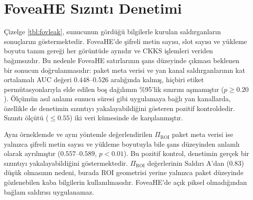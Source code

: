 \section{FoveaHE Sızıntı Denetimi}\label{sec:res:fovleak}

Çizelge \ref{tbl:fovleak}, sunucunun gördüğü bilgilerle kurulan saldırganların sonuçlarını göstermektedir. FoveaHE'de şifreli metin sayısı, slot sayısı ve yükleme boyutu tanım gereği her görüntüde aynıdır ve CKKS işlemleri veriden bağımsızdır. Bu nedenle FoveaHE satırlarının şans düzeyinde çıkması beklenen bir sonucun doğrulanmasıdır: paket meta verisi ve yan kanal saldırganlarının kat ortalamalı AUC değeri $0.448$--$0.526$ aralığında kalmış, hiçbiri etiket permütasyonlarıyla elde edilen boş dağılımın \%95'lik sınırını aşmamıştır ($p \geq 0.20$). Ölçümün asıl anlamı sunucu süresi gibi uygulamaya bağlı yan kanallarda, özellikle de denetimin sızıntıyı yakalayabildiğini gösteren pozitif kontroldedir. Sızıntı ölçütü ($\leq 0.55$) iki veri kümesinde de karşılanmıştır.

Aynı örneklemde ve aynı yöntemle değerlendirilen $\Pi_{\mathrm{ROI}}$ paket meta verisi ise yalnızca şifreli metin sayısı ve yükleme boyutuyla bile şans düzeyinden anlamlı olarak ayrılmıştır ($0.557$--$0.589$, $p < 0.01$). Bu pozitif kontrol, denetimin gerçek bir sızıntıyı yakalayabildiğini göstermektedir. $\Pi_{\mathrm{ROI}}$ değerlerinin Saldırı A'dan ($0.83$) düşük olmasının nedeni, burada ROI geometrisi yerine yalnızca paket düzeyinde gözlenebilen kaba bilgilerin kullanılmasıdır. FoveaHE'de açık piksel olmadığından bağlam saldırısı uygulanamaz.

